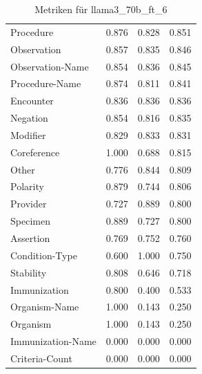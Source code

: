 \begin{table}[htbp]
\begin{tabular}{p{5cm}ccc}
Procedure & 0.876 & 0.828 & 0.851 \\
Observation & 0.857 & 0.835 & 0.846 \\
Observation-Name & 0.854 & 0.836 & 0.845 \\
Procedure-Name & 0.874 & 0.811 & 0.841 \\
Encounter & 0.836 & 0.836 & 0.836 \\
Negation & 0.854 & 0.816 & 0.835 \\
Modifier & 0.829 & 0.833 & 0.831 \\
Coreference & 1.000 & 0.688 & 0.815 \\
Other & 0.776 & 0.844 & 0.809 \\
Polarity & 0.879 & 0.744 & 0.806 \\
Provider & 0.727 & 0.889 & 0.800 \\
Specimen & 0.889 & 0.727 & 0.800 \\
Assertion & 0.769 & 0.752 & 0.760 \\
Condition-Type & 0.600 & 1.000 & 0.750 \\
Stability & 0.808 & 0.646 & 0.718 \\
Immunization & 0.800 & 0.400 & 0.533 \\
Organism-Name & 1.000 & 0.143 & 0.250 \\
Organism & 1.000 & 0.143 & 0.250 \\
Immunization-Name & 0.000 & 0.000 & 0.000 \\
Criteria-Count & 0.000 & 0.000 & 0.000 \\
\bottomrule
\end{tabular}
\caption{Metriken für llama3_70b_ft_6}
\label{tab:metrics_llama3_70b_ft_6}
\end{table}